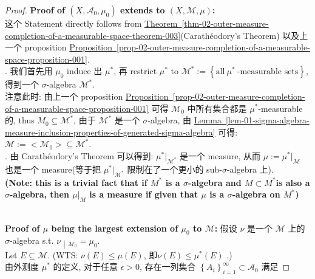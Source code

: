 \documentclass{qlnotes-export}
\begin{document}
\begin{proof}

\textbf{Proof of \((X,\mathcal{A}_{0},\mu_{0})\) extends to \((X,\mathcal{M},\mu)\):}\\
这个 Statement directly follows from \hyperref[thm-02-outer-measure-completion-of-a-measurable-space-theorem-003]{Theorem~\ref*{thm-02-outer-measure-completion-of-a-measurable-space-theorem-003}}(Carathéodory's Theorem) 以及上一个 proposition \hyperref[prop-02-outer-measure-completion-of-a-measurable-space-proposition-001]{Proposition~\ref*{prop-02-outer-measure-completion-of-a-measurable-space-proposition-001}}.\\
. 我们首先用 \(\mu_{0}\) induce 出 \(\mu^{\ast}\), 再 restrict \(\mu^{\ast}\) to \(\mathcal{M}^{\ast} := \left\{ {\text{all}\ \mu^{\ast}\ \text{-measurable sets}} \right\}\), 得到一个 \(\sigma\)-algebra \(\mathcal{M}^{\ast}\).\\
注意此时: 由上一个 proposition \hyperref[prop-02-outer-measure-completion-of-a-measurable-space-proposition-001]{Proposition~\ref*{prop-02-outer-measure-completion-of-a-measurable-space-proposition-001}} 可得 \(\mathcal{M}_{0}\) 中所有集合都是 \(\mu^{\ast}\)-measurable 的, thus \(M_{0} \subseteq \mathcal{M}^{\ast}\), 由于 \(\mathcal{M}^{\ast}\) 是一个 \(\sigma\)-algebra, 由 \hyperref[lem-01-sigma-algebra-measure-inclusion-properties-of-generated-sigma-algebra]{Lemma~\ref*{lem-01-sigma-algebra-measure-inclusion-properties-of-generated-sigma-algebra}} 可得: \(\mathcal{M} := < \mathcal{M}_{0} > \subseteq \mathcal{M}^{\ast}\).\\
. 由 Carathéodory's Theorem 可以得到: \(\mu^{\ast}|_{\mathcal{M}^{\ast}}\) 是一个 measure, 从而 \(\mu := \mu^{\ast}|_{\mathcal{M}}\) 也是一个 measure(等于把 \(\mu^{\ast}|_{\mathcal{M}^{\ast}}\) 限制在了一个更小的 sub-\(\sigma\)-algebra 上).\\
\textbf{(Note: this is a trivial fact that if \(M^{\ast}\) is a \(\sigma\)-algebra and \(M \subset M^{\ast}\)is also a \(\sigma\)-algebra, then \(\mu|_{M}\) is a measure if given that \(\mu\) is a \(\sigma\)-algebra on \(M^{\ast}\))}\\
\strut \\
\textbf{Proof of \(\mu\) being the largest extension of \(\mu_{0}\) to \(\mathcal{M}\):} 假设 \(\nu\) 是一个 \(\mathcal{M}\) 上的 \(\sigma\)-algebra s.t. \(\left. \nu \middle| {}_{\mathcal{M}_{0}} = \mu_{0} \right.\).\\
Let \(E \subseteq \mathcal{M}\). (WTS: \(\nu(E) \leq \mu(E)\), 即\(\nu(E) \leq \mu^{\ast}(E)\) .)\\
由外测度 \(\mu^{\ast}\) 的定义, 对于任意 \(\epsilon > 0\), 存在一列集合 \(\left\{ A_{i} \right\}_{i = 1}^{\infty} \subset \mathcal{A}_{0}\) 满足


\end{proof}
\end{document}
